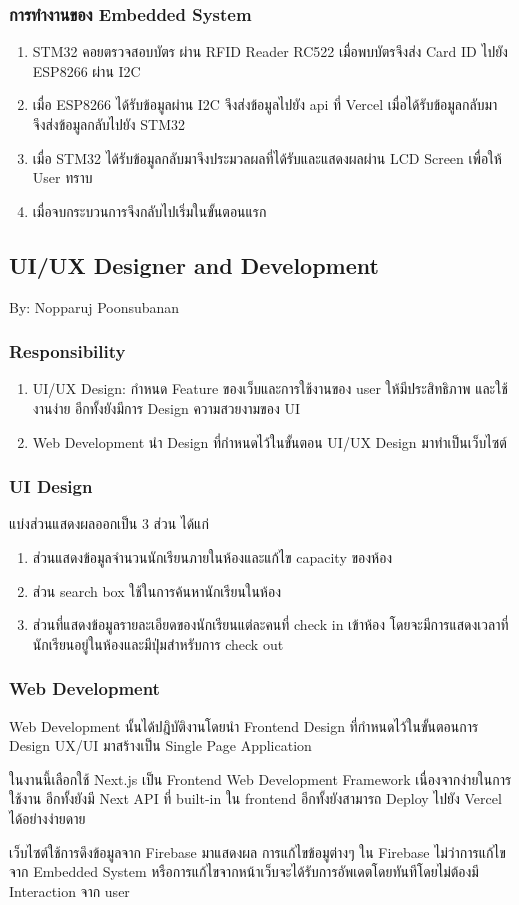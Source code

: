 \documentclass[fontsize=14pt]{extarticle}
\begin{document}
\subsubsection{การทำงานของ Embedded System}
\begin{enumerate}
    \item STM32 คอยตรวจสอบบัตร  ผ่าน RFID Reader RC522 เมื่อพบบัตรจึงส่ง Card ID ไปยัง ESP8266 ผ่าน I2C
    \item เมื่อ ESP8266 ได้รับข้อมูลผ่าน I2C จึงส่งข้อมูลไปยัง api ที่ Vercel เมื่อได้รับข้อมูลกลับมา จึงส่งข้อมูลกลับไปยัง STM32
    \item เมื่อ STM32 ได้รับข้อมูลกลับมาจึงประมวลผลที่ได้รับและแสดงผลผ่าน LCD Screen เพื่อให้ User ทราบ
    \item เมื่อจบกระบวนการจึงกลับไปเริ่มในขั้นตอนแรก
\end{enumerate}
\pagebreak
\subsection{UI/UX Designer and Development}
By: Nopparuj Poonsubanan
\subsubsection{Responsibility}
\begin{enumerate}
    \item UI/UX Design: กำหนด Feature ของเว็บและการใช้งานของ user ให้มีประสิทธิภาพ และใช้งานง่าย อีกทั้งยังมีการ Design ความสวยงามของ UI
    \item Web Development นำ Design ที่กำหนดไว้ในขั้นตอน UI/UX Design มาทำเป็นเว็บไซต์
\end{enumerate}
\subsubsection{UI Design}
    แบ่งส่วนแสดงผลออกเป็น 3 ส่วน ได้แก่
    \begin{enumerate}
        \item ส่วนแสดงข้อมูลจำนวนนักเรียนภายในห้องและแก้ไข capacity ของห้อง
        \item ส่วน search box ใช้ในการค้นหานักเรียนในห้อง
        \item ส่วนที่แสดงข้อมูลรายละเอียดของนักเรียนแต่ละคนที่ check in เข้าห้อง โดยจะมีการแสดงเวลาที่นักเรียนอยู่ในห้องและมีปุ่มสำหรับการ check out
    \end{enumerate}
\subsubsection{Web Development}
\par Web Development นั้นได้ปฎิบัติงานโดยนำ Frontend Design ที่กำหนดไว้ในขั้นตอนการ Design UX/UI มาสร้างเป็น Single Page Application
\par ในงานนี้เลือกใช้ Next.js เป็น Frontend Web Development Framework เนื่องจากง่ายในการใช้งาน อีกทั้งยังมี Next API ที่ built-in ใน frontend อีกทั้งยังสามารถ Deploy ไปยัง Vercel ได้อย่างง่ายดาย
\par เว็บไซต์ใช้การดึงข้อมูลจาก Firebase มาแสดงผล การแก้ไขข้อมูต่างๆ ใน Firebase ไม่ว่าการแก้ไขจาก Embedded System หรือการแก้ไขจากหน้าเว็บจะได้รับการอัพเดตโดยทันทีโดยไม่ต้องมี Interaction จาก user
\pagebreak
\end{document}
